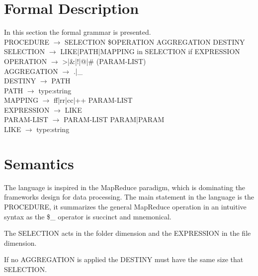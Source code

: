 \documentclass{article}
\begin{document}
\section{Formal Description}

In this section the formal grammar is presented.
\\

PROCEDURE $\rightarrow$ SELECTION \$OPERATION AGGREGATION DESTINY
\\

SELECTION $\rightarrow$ LIKE|PATH|MAPPING in SELECTION if EXPRESSION
\\

OPERATION $\rightarrow$ >|\&|!|@|\# (PARAM-LIST)
\\

AGGREGATION $\rightarrow$ .|\_
\\

DESTINY $\rightarrow$ PATH
\\

PATH $\rightarrow$ type:string
\\

MAPPING $\rightarrow$ ff|rr|cc|++ PARAM-LIST
\\

EXPRESSION $\rightarrow$ LIKE
\\

PARAM-LIST $\rightarrow$ PARAM-LIST PARAM|PARAM
\\

LIKE $\rightarrow$ type:string

\section{Semantics}
The language is inspired in the MapReduce paradigm, which is dominating the
frameworks design for data processing. The main statement in the language
is the PROCEDURE, it summarizes the general MapReduce operation in an
intuitive syntax as the \$\_ operator is succinct and mnemonical.

The SELECTION acts in the folder dimension and the EXPRESSION in the
file dimension.

If no AGGREGATION is applied the DESTINY must have the same size that
SELECTION.

\end{document}
